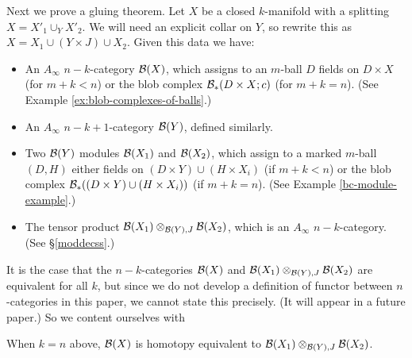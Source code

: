 Next we prove a gluing theorem.
Let $X$ be a closed $k$-manifold with a splitting $X = X'_1\cup_Y X'_2$.
We will need an explicit collar on $Y$, so rewrite this as
$X = X_1\cup (Y\times J) \cup X_2$.
Given this data we have:
\begin{itemize}
\item An $A_\infty$ $n{-}k$-category ${\mathcal B}(X)$, which assigns to an $m$-ball
$D$ fields on $D\times X$ (for $m+k < n$) or the blob complex ${\mathcal B}_*(D\times X; c)$
(for $m+k = n$).
(See Example \ref{ex:blob-complexes-of-balls}.)
\item An $A_\infty$ $n{-}k{+}1$-category ${\mathcal B}(Y)$, defined similarly.
\item Two ${\mathcal B}(Y)$ modules ${\mathcal B}(X_1)$ and ${\mathcal B}(X_2)$, which assign to a marked
$m$-ball $(D, H)$ either fields on $(D\times Y) \cup (H\times X_i)$ (if $m+k < n$)
or the blob complex ${\mathcal B}_*((D\times Y) \cup (H\times X_i))$ (if $m+k = n$).
(See Example \ref{bc-module-example}.)
\item The tensor product ${\mathcal B}(X_1) \otimes_{{\mathcal B}(Y), J} {\mathcal B}(X_2)$, which is
an $A_\infty$ $n{-}k$-category.
(See \S \ref{moddecss}.)
\end{itemize}

It is the case that the $n{-}k$-categories ${\mathcal B}(X)$ and ${\mathcal B}(X_1) \otimes_{{\mathcal B}(Y), J} {\mathcal B}(X_2)$
are equivalent for all $k$, but since we do not develop a definition of functor between $n$-categories
in this paper, we cannot state this precisely.
(It will appear in a future paper.)
So we content ourselves with

\begin{thm}
\label{thm:gluing}
When $k=n$ above, ${\mathcal B}(X)$ is homotopy equivalent to ${\mathcal B}(X_1) \otimes_{{\mathcal B}(Y), J} {\mathcal B}(X_2)$.
\end{thm}

